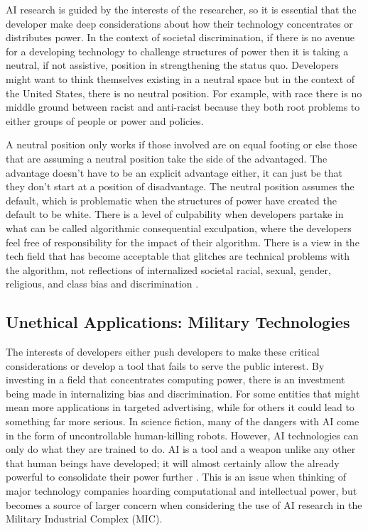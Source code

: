 \documentclass[10pt,twocolumn]{article}
\begin{document}
AI research is guided by the interests of the researcher, so it is essential that the developer make deep considerations about how their technology concentrates or distributes power. In the context of societal discrimination, if there is no avenue for a developing technology to challenge structures of power then it is taking a neutral, if not assistive, position in strengthening the status quo. Developers might want to think themselves existing in a neutral space but in the context of the United States, there is no neutral position. For example, with race there is no middle ground between racist and anti-racist \cite{Kendi2019} because they both root problems to either groups of people or power and policies.

A neutral position only works if those involved are on equal footing or else those that are assuming a neutral position take the side of the advantaged. The advantage doesn’t have to be an explicit advantage either, it can just be that they don’t start at a position of disadvantage. The neutral position assumes the default, which is problematic when the structures of power have created the default to be white. There is a level of culpability when developers partake in what can be called algorithmic consequential exculpation, where the developers feel free of responsibility for the impact of their algorithm. There is a view in the tech field that has become acceptable that glitches are technical problems with the algorithm, not reflections of internalized societal racial, sexual, gender, religious, and class bias and discrimination \cite{Benjamin2020}.

\subsection{Unethical Applications: Military Technologies}

The interests of developers either push developers to make these critical considerations or develop a tool that fails to serve the public interest. By investing in a field that concentrates computing power, there is an investment being made in internalizing bias and discrimination. For some entities that might mean more applications in targeted advertising, while for others it could lead to something far more serious. In science fiction, many of the dangers with AI come in the form of uncontrollable human-killing robots. However, AI technologies can only do what they are trained to do. AI is a tool and a weapon unlike any other that human beings have developed; it will almost certainly allow the already powerful to consolidate their power further \cite{Harari2018}. This is an issue when thinking of major technology companies hoarding computational and intellectual power, but becomes a source of larger concern when considering the use of AI research in the Military Industrial Complex (MIC).
\end{document}
